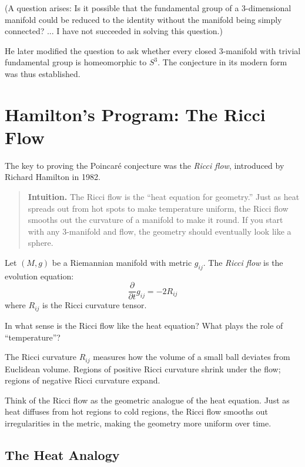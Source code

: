 (A question arises: Is it possible that the fundamental group of a 3-dimensional manifold could be reduced to the identity without the manifold being simply connected? ... I have not succeeded in solving this question.)

He later modified the question to ask whether every closed 3-manifold with trivial fundamental group is homeomorphic to $S^3$. The conjecture in its modern form was thus established.

\section{Hamilton's Program: The Ricci Flow}

The key to proving the Poincar\'{e} conjecture was the \textit{Ricci flow}, introduced by Richard Hamilton in 1982.

\begin{quote}
\textbf{Intuition.} The Ricci flow is the ``heat equation for geometry.'' Just as heat spreads out from hot spots to make temperature uniform, the Ricci flow smooths out the curvature of a manifold to make it round. If you start with any 3-manifold and flow, the geometry should eventually look like a sphere.
\end{quote}

\begin{definition}
Let $(M, g)$ be a Riemannian manifold with metric $g_{ij}$. The \textit{Ricci flow} is the evolution equation:
\[
\frac{\partial}{\partial t} g_{ij} = -2 R_{ij}
\]
where $R_{ij}$ is the Ricci curvature tensor.
\end{definition}

\begin{checkyou}
In what sense is the Ricci flow like the heat equation? What plays the role of ``temperature''?
\end{checkyou}

The Ricci curvature $R_{ij}$ measures how the volume of a small ball deviates from Euclidean volume. Regions of positive Ricci curvature shrink under the flow; regions of negative Ricci curvature expand.

Think of the Ricci flow as the geometric analogue of the heat equation. Just as heat diffuses from hot regions to cold regions, the Ricci flow smooths out irregularities in the metric, making the geometry more uniform over time.

\subsection{The Heat Analogy}

